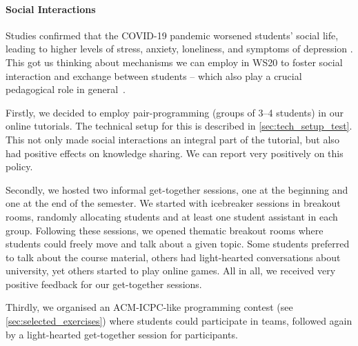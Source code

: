 \paragraph{Social Interactions}
Studies confirmed that the COVID-19 pandemic
worsened students' social life,
leading to higher levels of stress, anxiety, loneliness, and symptoms of depression \cite{students_lockdown1}.
This got us thinking about mechanisms we
can employ in WS20 to foster social interaction and exchange between students
-- which also play a crucial pedagogical role in general~\cite{impact_social_interaction}.

Firstly, we decided to employ pair-programming (groups of 3--4 students)
in our online tutorials.
The technical setup for this is described in \cref{sec:tech_setup_test}.
This not only made social interactions an integral part of the tutorial,
but also had positive effects on knowledge sharing.
We can report very positively on this policy.

Secondly, we hosted two informal get-together sessions,
one at the beginning and one at the end of the semester.
We started with icebreaker sessions in breakout rooms,
randomly allocating students and at least one student assistant in each group.
Following these sessions,
we opened thematic breakout rooms where students
could freely move and talk about a given topic.
Some students preferred to talk about the course material, others had
light-hearted conversations about university, yet others started to play online games.
All in all, we received very positive feedback for our get-together sessions.

Thirdly, we organised an
ACM-ICPC-like programming contest (see \cref{sec:selected_exercises})
where students could participate in teams,
followed again by a light-hearted get-together session
for participants.
